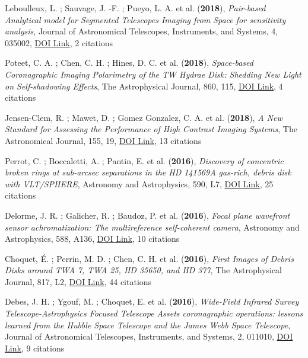\documentclass[11pt]{article}
\begin{document}
\begin{etaremune}
 \item Leboulleux, L. ; Sauvage, J. -F. ; Pueyo, L. A. et al. ({\bf2018}), {\it Pair-based Analytical model for Segmented Telescopes Imaging from Space for sensitivity analysis}, Journal of Astronomical Telescopes, Instruments, and Systems, 4, 035002, \href{https://doi.org/10.1117/1.JATIS.4.3.035002}{DOI Link}, 2 citations

 \item Poteet, C. A. ; Chen, C. H. ; Hines, D. C. et al. ({\bf2018}), {\it Space-based Coronagraphic Imaging Polarimetry of the TW Hydrae Disk: Shedding New Light on Self-shadowing Effects}, The Astrophysical Journal, 860, 115, \href{https://doi.org/10.3847/1538-4357/aac2e4}{DOI Link}, 4 citations

 \item Jensen-Clem, R. ; Mawet, D. ; Gomez Gonzalez, C. A. et al. ({\bf2018}), {\it A New Standard for Assessing the Performance of High Contrast Imaging Systems}, The Astronomical Journal, 155, 19, \href{https://doi.org/10.3847/1538-3881/aa97e4}{DOI Link}, 13 citations

 \item Perrot, C. ; Boccaletti, A. ; Pantin, E. et al. ({\bf2016}), {\it Discovery of concentric broken rings at sub-arcsec separations in the HD 141569A gas-rich, debris disk with VLT/SPHERE}, Astronomy and Astrophysics, 590, L7, \href{https://doi.org/10.1051/0004-6361/201628396}{DOI Link}, 25 citations

 \item Delorme, J. R. ; Galicher, R. ; Baudoz, P. et al. ({\bf2016}), {\it Focal plane wavefront sensor achromatization: The multireference self-coherent camera}, Astronomy and Astrophysics, 588, A136, \href{https://doi.org/10.1051/0004-6361/201527657}{DOI Link}, 10 citations

 \item Choquet, {\'E}. ; Perrin, M. D. ; Chen, C. H. et al. ({\bf2016}), {\it First Images of Debris Disks around TWA 7, TWA 25, HD 35650, and HD 377}, The Astrophysical Journal, 817, L2, \href{https://doi.org/10.3847/2041-8205/817/1/L2}{DOI Link}, 44 citations

 \item Debes, J. H. ; Ygouf, M. ; Choquet, E. et al. ({\bf2016}), {\it Wide-Field Infrared Survey Telescope-Astrophysics Focused Telescope Assets coronagraphic operations: lessons learned from the Hubble Space Telescope and the James Webb Space Telescope}, Journal of Astronomical Telescopes, Instruments, and Systems, 2, 011010, \href{https://doi.org/10.1117/1.JATIS.2.1.011010}{DOI Link}, 9 citations


\end{etaremune}
\end{document}
